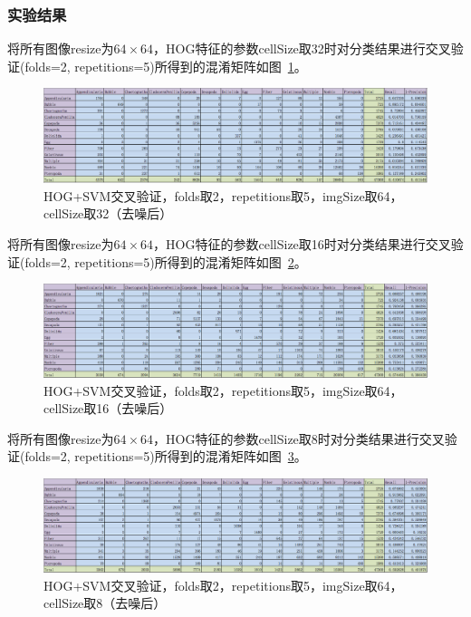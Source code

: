 \documentclass[12pt]{article}
\begin{document}
\subsubsection{实验结果}
将所有图像resize为$64 \times 64$，HOG特征的参数cellSize取32时对分类结果进行交叉验证(folds=2, repetitions=5)所得到的混淆矩阵如图~\ref{fig:HOG-SVM-2-folds-5-repetitions-32-64-noNoise}。
\begin{figure}[!ht]
\centering
\includegraphics[width=1.0\linewidth]{HOG-SVM-2-folds-5-repetitions-32-64-noNoise}
\caption{HOG+SVM交叉验证，folds取2，repetitions取5，imgSize取64，cellSize取32（去噪后）}
\label{fig:HOG-SVM-2-folds-5-repetitions-32-64-noNoise}
\end{figure}

将所有图像resize为$64 \times 64$，HOG特征的参数cellSize取16时对分类结果进行交叉验证(folds=2, repetitions=5)所得到的混淆矩阵如图~\ref{fig:HOG-SVM-2-folds-5-repetitions-16-64-noNoise}。
\begin{figure}[!ht]
\centering
\includegraphics[width=1.0\linewidth]{HOG-SVM-2-folds-5-repetitions-16-64-noNoise}
\caption{HOG+SVM交叉验证，folds取2，repetitions取5，imgSize取64，cellSize取16（去噪后）}
\label{fig:HOG-SVM-2-folds-5-repetitions-16-64-noNoise}
\end{figure}

将所有图像resize为$64 \times 64$，HOG特征的参数cellSize取8时对分类结果进行交叉验证(folds=2, repetitions=5)所得到的混淆矩阵如图~\ref{fig:HOG-SVM-2-folds-5-repetitions-8-64-noNoise}。
\begin{figure}[!ht]
\centering
\includegraphics[width=1.0\linewidth]{HOG-SVM-2-folds-5-repetitions-8-64-noNoise}
\caption{HOG+SVM交叉验证，folds取2，repetitions取5，imgSize取64，cellSize取8（去噪后）}
\label{fig:HOG-SVM-2-folds-5-repetitions-8-64-noNoise}
\end{figure}
\end{document}
